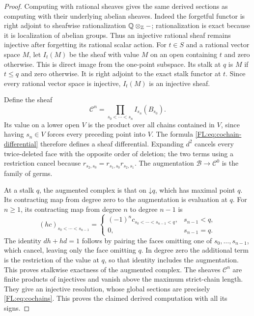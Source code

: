 \begin{proof}
Computing with rational sheaves gives the same derived sections as
computing with their underlying abelian sheaves. Indeed the forgetful
functor is right adjoint to sheafwise rationalization
$\mathbb Q\otimes_{\mathbb Z}-$; rationalization is exact because it is
localization of abelian groups. Thus an injective rational sheaf
remains injective after forgetting its rational scalar action.
For $t\in S$ and a rational vector space $M$, let $I_t(M)$ be the
sheaf with value $M$ on an open containing $t$ and zero otherwise.
This is direct image from the one-point subspace. Its stalk at $q$
is $M$ if $t\le q$ and zero otherwise. It is right adjoint to the
exact stalk functor at $t$. Since every rational vector space is
injective, $I_t(M)$ is an injective sheaf.

Define the sheaf
\[
 \mathcal C^n=\prod_{s_0<\cdots<s_n}I_{s_n}(B_{s_0}).
\]
Its value on a lower open $V$ is the product over all chains contained
in $V$, since having $s_n\in V$ forces every preceding point into
$V$. The formula \eqref{FL:eq:cochain-differential} therefore defines a
sheaf differential. Expanding $d^2$ cancels every twice-deleted face
with the opposite order of deletion; the two terms using a restriction
cancel because $r_{s_2,s_0}=r_{s_1,s_0}r_{s_2,s_1}$.
The augmentation $\mathcal B\to\mathcal C^0$ is the family of germs.

At a stalk $q$, the augmented complex is that on
$\mathord\downarrow q$, which has maximal point $q$.
Its contracting map from degree zero to the augmentation is evaluation
at $q$. For $n\ge1$, its contracting map from degree $n$ to degree
$n-1$ is
\[
 (hc)_{s_0<\cdots<s_{n-1}}=
 \begin{cases}
 (-1)^n c_{s_0<\cdots<s_{n-1}<q},&s_{n-1}<q,\\
 0,&s_{n-1}=q.
 \end{cases}
\]
The identity $dh+hd=1$ follows by pairing the faces omitting one of
$s_0,\ldots,s_{n-1}$, which cancel, leaving only the face omitting
$q$. In degree zero the additional term is the restriction of the
value at $q$, so that identity includes the augmentation. This proves
stalkwise exactness of the augmented complex. The sheaves
$\mathcal C^n$ are finite products of injectives and vanish above the
maximum strict-chain length. They give an injective resolution, whose
global sections are precisely \eqref{FL:eq:cochains}. This proves the
claimed derived computation with all its signs.
\end{proof}

